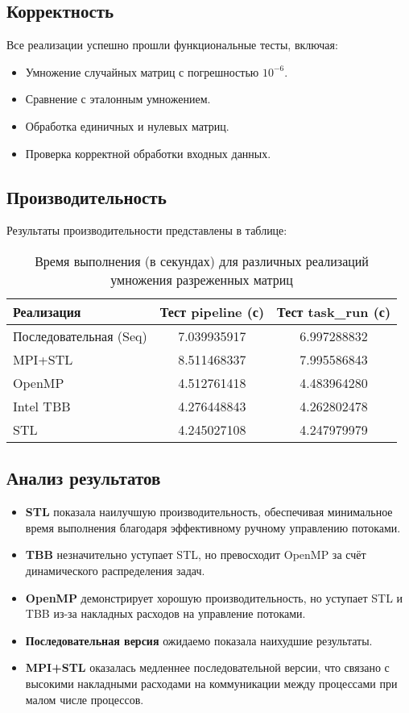 \documentclass[a4paper,12pt]{article}
\begin{document}
\subsection{Корректность}
Все реализации успешно прошли функциональные тесты, включая:
\begin{itemize}
    \item Умножение случайных матриц с погрешностью \( 10^{-6} \).
    \item Сравнение с эталонным умножением.
    \item Обработка единичных и нулевых матриц.
    \item Проверка корректной обработки входных данных.
\end{itemize}
\newpage
\subsection{Производительность}
Результаты производительности представлены в таблице:

\begin{table}[h]
\centering
\caption{Время выполнения (в секундах) для различных реализаций умножения разреженных матриц}
\begin{tabular}{lcc}
\toprule
\textbf{Реализация} & \textbf{Тест pipeline (с)} & \textbf{Тест task\_run (с)} \\
\midrule
Последовательная (Seq) & 7.039935917 & 6.997288832 \\
MPI+STL & 8.511468337 & 7.995586843 \\
OpenMP & 4.512761418 & 4.483964280 \\
Intel TBB & 4.276448843 & 4.262802478 \\
STL & 4.245027108 & 4.247979979 \\
\bottomrule
\end{tabular}
\end{table}

\subsection{Анализ результатов}
\begin{itemize}
    \item \textbf{STL} показала наилучшую производительность, обеспечивая минимальное время выполнения благодаря эффективному ручному управлению потоками.
    \item \textbf{TBB} незначительно уступает STL, но превосходит OpenMP за счёт динамического распределения задач.
    \item \textbf{OpenMP} демонстрирует хорошую производительность, но уступает STL и TBB из-за накладных расходов на управление потоками.
    \item \textbf{Последовательная версия} ожидаемо показала наихудшие результаты.
    \item \textbf{MPI+STL} оказалась медленнее последовательной версии, что связано с высокими накладными расходами на коммуникации между процессами при малом числе процессов.
\end{itemize}
\end{document}
